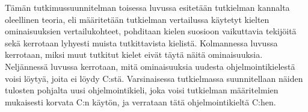 %


Tämän tutkimussuunnitelman toisessa luvussa esitetään tutkielman kannalta
oleellinen teoria, eli määritetään tutkielman vertailussa käytetyt kielten
ominaisuuksien vertailukohteet, pohditaan kielen suosioon vaikuttavia tekijöitä
sekä kerrotaan lyhyesti muista tutkittavista kielistä. Kolmannessa luvussa
kerrotaan, miksi muut tutkitut kielet eivät täytä näitä ominaisuuksia.
Neljännessä luvussa kerrotaan, mitä ominaisuuksia uudesta ohjelmointikielestä
voisi löytyä, joita ei löydy C:stä. Varsinaisessa tutkielmassa suunnitellaan
näiden tulosten pohjalta uusi ohjelmointikieli, joka voisi tutkielman
määritelmien mukaisesti korvata C:n käytön, ja verrataan tätä ohjelmointikieltä
C:hen.

